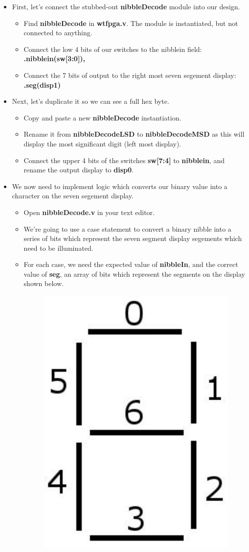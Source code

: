 \documentclass[12pt,a4paper]{article}
\begin{document}
\begin{itemize}
	\item First, let's connect the stubbed-out \textbf{nibbleDecode} module into our design. 
	\begin{itemize}
		\item Find \textbf{nibbleDecode} in \textbf{wtfpga.v}. The module is instantiated, but not connected to anything. 
		\item Connect the low 4 bits of our switches to the nibblein field: \textbf{.nibblein(sw[3:0]),}
		\item Connect the 7 bits of output to the right most seven segement display: \textbf{.seg(disp1)}
	\end{itemize}
	\item Next, let's duplicate it so we can see a full hex byte.
	\begin{itemize}
		\item Copy and paste a new \textbf{nibbleDecode} instantiation. 
		\item Rename it from \textbf{nibbleDecodeLSD} to \textbf{nibbleDecodeMSD} as this will display the most significant digit (left most display).
		\item Connect the upper 4 bits of the switches \textbf{sw[7:4]} to \textbf{nibblein}, and rename the output display to \textbf{disp0}.
	\end{itemize}
	\item We now need to implement logic which converts our binary value into a character on the seven segement display.
	\begin{itemize}
		\item Open \textbf{nibbleDecode.v} in your text editor. 
		\item We're going to use a case statement to convert a binary nibble into a series of bits which represent the seven segment display segements which need to be illuminated. 
		\item For each case, we need the expected value of \textbf{nibbleIn}, and the correct value of \textbf{seg}, an array of bits which represent the segments on the display shown below.
		\begin{figure}[H]
		\begin{center}
			\includegraphics[width=0.2\linewidth]{segments.png}

\end{center}
\end{figure}
\end{itemize}
\end{itemize}
\end{document}
